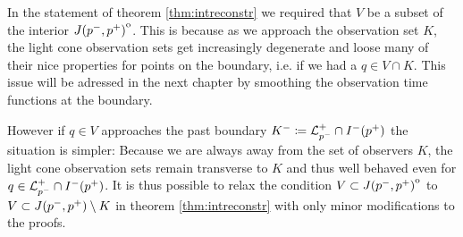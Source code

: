 \begin{remark}\label{rmk:ReconstrPastBoundary}
    In the statement of theorem \ref{thm:intreconstr} we required that $V$ be a subset of the interior ${\kern0ptJ(p^-,p^+)}^{\mathrm{o}}$. This is because as we approach the observation set $K$, the light cone observation sets get increasingly degenerate and loose many of their nice properties for points on the boundary, i.e. if we had a $q\in V\cap K$. This issue will be adressed in the next chapter by smoothing the observation time functions at the boundary.

    However if $q\in V$ approaches the past boundary $K^-\coloneqq {\mathcal{L}}^+_{p^-}\cap I^-(p^+)$ the situation is simpler: Because we are always away from the set of observers $K$, the light cone observation sets remain transverse to $K$ and thus well behaved even for $q\in {\mathcal{L}}^+_{p^-}\cap I^-(p^+)$. It is thus possible to relax the condition $V\subset {\kern0ptJ(p^-,p^+)}^{\mathrm{o}}$ to $V\subset J(p^-,p^+) \setminus K$ in theorem \ref{thm:intreconstr} with only minor modifications to the proofs.
\end{remark}